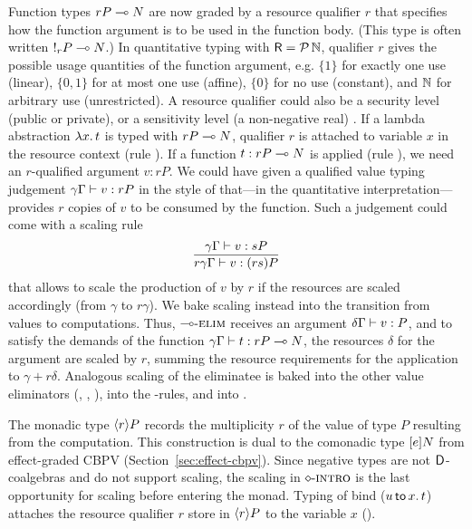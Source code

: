 \documentclass[acmsmall,review,anonymous]{acmart}\settopmatter{printfolios=true,printccs=false,printacmref=false}
\begin{document}
Function types $\qfun r P N$ are now graded by a resource qualifier
$r$ that specifies how the function argument is to be used in the
function body.  (This type is often written $!_{r}P \lolli N$.)  In
quantitative typing with $\R = \Pot \bN$, qualifier $r$ gives the
possible usage quantities of the function argument, e.g. $\{1\}$ for
exactly one use (linear), $\{0,1\}$ for at most one use (affine),
$\{0\}$ for no use (constant), and $\bN$ for arbitrary use
(unrestricted).  A resource qualifier could also be a security level
(public or private), or a sensitivity level (a non-negative real)
\citep{reedPierce:icfp10}.  If a lambda abstraction $\lam x t$ is
typed with $\qfun r P N$, qualifier $r$ is attached to variable $x$ in
the resource context (rule \rintro\lolli).  If a function
$t : \qfun r P N$ is applied (rule \relim\lolli), we need an
$r$-qualified argument $v : rP$.  We could have given a qualified
value typing judgement $\qValTy \gamma \Gamma v {rP}$ in the style of
\citet{mcBride:wadler60} that---in the quantitative
interpretation---provides $r$ copies of $v$ to be consumed by the
function.  Such a judgement could come with a scaling rule
\[
\ru{\qValTy \gamma \Gamma v {sP}
  }{\qValTy{r\gamma}\Gamma v {(rs)P}}
\]
that allows to scale the production of $v$ by $r$ if the resources are
scaled accordingly (from $\gamma$ to $r\gamma$).  We bake scaling instead
into the transition from values to computations.
Thus, $\relim\lolli$ receives an
argument $\qValTy \delta \Gamma v P$, and to satisfy the demands of
the function $\qCompTy \gamma \Gamma t {\qfun r P N}$, the resources
$\delta$ for the argument are scaled by $r$, summing the resource
requirements for the application to $\gamma + r\delta$.
%
Analogous scaling of the eliminatee is baked into the other value
eliminators (\relim\Box, \relim\GS, \relim\otimes), into the
\rlet-rules, and into \rintro\diamond.

The monadic type $\compty r P$ records the multiplicity $r$ of the
value of type $P$ resulting from the computation.  This construction
is dual to the comonadic type $\thunkty e N$ from effect-graded CBPV
(Section~\ref{sec:effect-cbpv}).  Since negative types are not
$\D$-coalgebras and do not support scaling, the scaling in
$\rintro\diamond$ is the last opportunity for scaling before entering
the monad.  Typing of bind ($\bind x u t$) attaches the resource qualifier $r$ store in $\compty r P$ to the variable $x$ (\relim\diamond).
\end{document}
